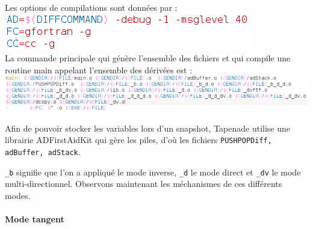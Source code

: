 Les options de compilations sont données par :\\
\includegraphics[scale=0.7]{code/flags.png}\\








La commande principale qui génère l'ensemble des fichiers et qui compile une routine 
main appelant l'ensemble des dérivées est :\\
\includegraphics[scale=0.6]{code/main.png}


Afin de pouvoir stocker les variables lors d'un snapshot, Tapenade utilise une librairie
ADFirstAidKit qui g\`ere les piles, d'où les fichiers 
\verb!PUSHPOPDiff, adBuffer, adStack!.


{\tt \_b} signifie que l'on a appliqué le mode inverse, {\tt \_d} le mode direct et {\tt \_dv} le mode multi-directionnel.
Observons maintenant les méchanismes de ces différents modes.

\paragraph{Mode tangent} \hfill \\

